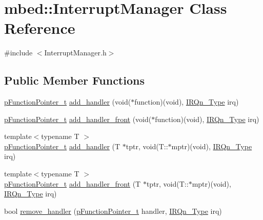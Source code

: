 \hypertarget{classmbed_1_1_interrupt_manager}{}\section{mbed\+:\+:Interrupt\+Manager Class Reference}
\label{classmbed_1_1_interrupt_manager}


{\ttfamily \#include $<$Interrupt\+Manager.\+h$>$}

\subsection*{Public Member Functions}
\begin{DoxyCompactItemize}
\item 
\hyperlink{classmbed_1_1_function_pointer_arg1}{p\+Function\+Pointer\+\_\+t} \hyperlink{classmbed_1_1_interrupt_manager_a17e717ff89d096a000f674b46ca7e849}{add\+\_\+handler} (void($\ast$function)(void), \hyperlink{group___peripheral__interrupt__number__definition_ga7e1129cd8a196f4284d41db3e82ad5c8}{I\+R\+Qn\+\_\+\+Type} irq)
\item 
\hyperlink{classmbed_1_1_function_pointer_arg1}{p\+Function\+Pointer\+\_\+t} \hyperlink{classmbed_1_1_interrupt_manager_ad7250442830a84d34ee2fcd84664fe9d}{add\+\_\+handler\+\_\+front} (void($\ast$function)(void), \hyperlink{group___peripheral__interrupt__number__definition_ga7e1129cd8a196f4284d41db3e82ad5c8}{I\+R\+Qn\+\_\+\+Type} irq)
\item 
{\footnotesize template$<$typename T $>$ }\\\hyperlink{classmbed_1_1_function_pointer_arg1}{p\+Function\+Pointer\+\_\+t} \hyperlink{classmbed_1_1_interrupt_manager_aa964e760de62ab08711dcaae40732649}{add\+\_\+handler} (T $\ast$tptr, void(T\+::$\ast$mptr)(void), \hyperlink{group___peripheral__interrupt__number__definition_ga7e1129cd8a196f4284d41db3e82ad5c8}{I\+R\+Qn\+\_\+\+Type} irq)
\item 
{\footnotesize template$<$typename T $>$ }\\\hyperlink{classmbed_1_1_function_pointer_arg1}{p\+Function\+Pointer\+\_\+t} \hyperlink{classmbed_1_1_interrupt_manager_a9fb2a44246203de940e58ed9f696d872}{add\+\_\+handler\+\_\+front} (T $\ast$tptr, void(T\+::$\ast$mptr)(void), \hyperlink{group___peripheral__interrupt__number__definition_ga7e1129cd8a196f4284d41db3e82ad5c8}{I\+R\+Qn\+\_\+\+Type} irq)
\item 
bool \hyperlink{classmbed_1_1_interrupt_manager_a298699ba52acb35e8ed07cff1c31744f}{remove\+\_\+handler} (\hyperlink{classmbed_1_1_function_pointer_arg1}{p\+Function\+Pointer\+\_\+t} handler, \hyperlink{group___peripheral__interrupt__number__definition_ga7e1129cd8a196f4284d41db3e82ad5c8}{I\+R\+Qn\+\_\+\+Type} irq)
\end{DoxyCompactItemize}
